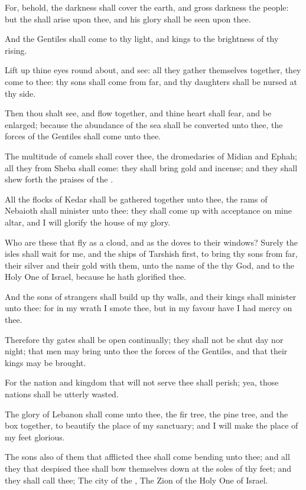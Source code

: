 \verse For, behold, the darkness shall cover the earth, and gross darkness the people: but the \LORD shall arise upon thee, and his glory shall be seen upon thee.

\verse And the Gentiles shall come to thy light, and kings to the brightness of thy rising.

\verse Lift up thine eyes round about, and see: all they gather themselves together, they come to thee: thy sons shall come from far, and thy daughters shall be nursed at thy side.

\verse Then thou shalt see, and flow together, and thine heart shall fear, and be enlarged; because the abundance of the sea shall be converted unto thee, the forces of the Gentiles shall come unto thee.

\verse The multitude of camels shall cover thee, the dromedaries of Midian and Ephah; all they from Sheba shall come: they shall bring gold and incense; and they shall shew forth the praises of the \LORD.

\verse All the flocks of Kedar shall be gathered together unto thee, the rams of Nebaioth shall minister unto thee: they shall come up with acceptance on mine altar, and I will glorify the house of my glory.

\verse Who are these that fly as a cloud, and as the doves to their windows?  \verse Surely the isles shall wait for me, and the ships of Tarshish first, to bring thy sons from far, their silver and their gold with them, unto the name of the \LORD thy God, and to the Holy One of Israel, because he hath glorified thee.

\verse And the sons of strangers shall build up thy walls, and their kings shall minister unto thee: for in my wrath I smote thee, but in my favour have I had mercy on thee.

\verse Therefore thy gates shall be open continually; they shall not be shut day nor night; that men may bring unto thee the forces of the Gentiles, and that their kings may be brought.

\verse For the nation and kingdom that will not serve thee shall perish; yea, those nations shall be utterly wasted.

\verse The glory of Lebanon shall come unto thee, the fir tree, the pine tree, and the box together, to beautify the place of my sanctuary; and I will make the place of my feet glorious.

\verse The sons also of them that afflicted thee shall come bending unto thee; and all they that despised thee shall bow themselves down at the soles of thy feet; and they shall call thee; The city of the \LORD, The Zion of the Holy One of Israel.

